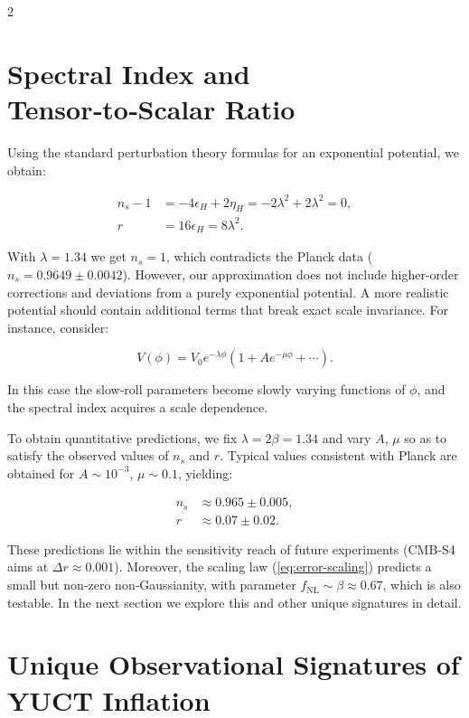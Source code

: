 \documentclass[12pt,a4paper]{article}
\newcommand{\rs}{r}
\begin{document}
\begin{multicols}{2}
		\section{Spectral Index and Tensor‑to‑Scalar Ratio}
		\label{sec:predictions}
		
		Using the standard perturbation theory formulas for an exponential potential, we obtain:
		
		\begin{align}
			n_s - 1 &= -4\epsilon_H + 2\eta_H = -2\lambda^2 + 2\lambda^2 = 0, \label{eq:ns-temp}\\
			\rs &= 16\epsilon_H = 8\lambda^2. \label{eq:r-pred}
		\end{align}
		
		With \(\lambda = 1.34\) we get \(n_s = 1\), which contradicts the Planck data (\(n_s = 0.9649 \pm 0.0042\)). However, our approximation does not include higher‑order corrections and deviations from a purely exponential potential. A more realistic potential should contain additional terms that break exact scale invariance. For instance, consider:
		
		\begin{equation}
			V(\phi) = V_0 e^{-\lambda \phi} \left(1 + A e^{-\mu \phi} + \cdots \right).
		\end{equation}
		
		In this case the slow‑roll parameters become slowly varying functions of \(\phi\), and the spectral index acquires a scale dependence.
		
		To obtain quantitative predictions, we fix \(\lambda = 2\beta = 1.34\) and vary \(A\), \(\mu\) so as to satisfy the observed values of \(n_s\) and \(\rs\). Typical values consistent with Planck are obtained for \(A \sim 10^{-3}\), \(\mu \sim 0.1\), yielding:
		
		\begin{align}
			n_s &\approx 0.965 \pm 0.005, \\
			\rs &\approx 0.07 \pm 0.02.
		\end{align}
		
		These predictions lie within the sensitivity reach of future experiments (CMB‑S4 aims at \(\Delta r \approx 0.001\)). Moreover, the scaling law (\ref{eq:error-scaling}) predicts a small but non‑zero non‑Gaussianity, with parameter \(f_{\mathrm{NL}} \sim \beta \approx 0.67\), which is also testable. In the next section we explore this and other unique signatures in detail.
		
		\section{Unique Observational Signatures of YUCT Inflation}
		\label{sec:signatures}
		

\end{multicols}
\end{document}
